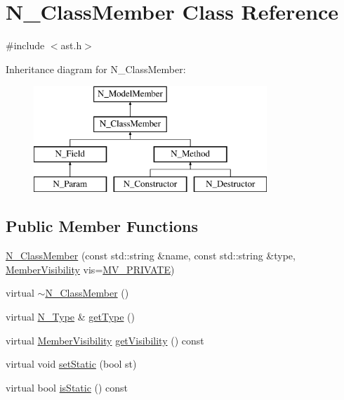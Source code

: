 \hypertarget{classN__ClassMember}{}\section{N\+\_\+\+Class\+Member Class Reference}
\label{classN__ClassMember}


{\ttfamily \#include $<$ast.\+h$>$}

Inheritance diagram for N\+\_\+\+Class\+Member\+:\begin{figure}[H]
\begin{center}
\leavevmode
\includegraphics[height=4.000000cm]{classN__ClassMember}
\end{center}
\end{figure}
\subsection*{Public Member Functions}
\begin{DoxyCompactItemize}
\item 
\hyperlink{classN__ClassMember_a579c8df412a16010bb152661ce8b07c9}{N\+\_\+\+Class\+Member} (const std\+::string \&name, const std\+::string \&type, \hyperlink{ast_8h_a8cf536792064de0e4fc620bc6f1dc90e}{Member\+Visibility} vis=\hyperlink{ast_8h_a8cf536792064de0e4fc620bc6f1dc90eae560d950ff759756c70399d8cfe015d0}{M\+V\+\_\+\+P\+R\+I\+V\+A\+T\+E})
\item 
virtual \hyperlink{classN__ClassMember_a7f5c3fa0c8df7ce0578a64a3ec6014df}{$\sim$\+N\+\_\+\+Class\+Member} ()
\item 
virtual \hyperlink{classN__Type}{N\+\_\+\+Type} \& \hyperlink{classN__ClassMember_a40afd3c10cbd60a14b88f5b615be79d6}{get\+Type} ()
\item 
virtual \hyperlink{ast_8h_a8cf536792064de0e4fc620bc6f1dc90e}{Member\+Visibility} \hyperlink{classN__ClassMember_a9d497fb4fd82c625095f8e8e7d60905d}{get\+Visibility} () const 
\item 
virtual void \hyperlink{classN__ClassMember_a859513b443ae1cd658241eca4be8b604}{set\+Static} (bool st)
\item 
virtual bool \hyperlink{classN__ClassMember_af26e06acc9e1eaacbccdfb0bced394d2}{is\+Static} () const 
\end{DoxyCompactItemize}
